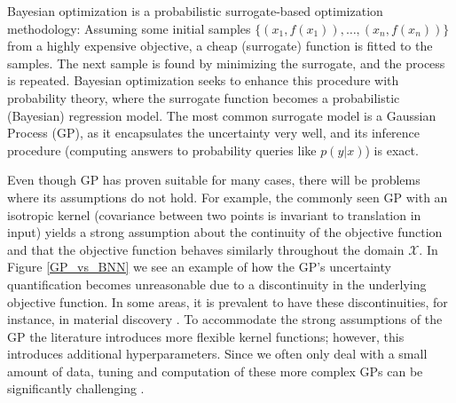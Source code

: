 Bayesian optimization is a probabilistic surrogate-based optimization methodology: Assuming some
initial samples $\{(x_1,f(x_1)), \dots, (x_n,f(x_n))\}$ from a highly expensive objective, a cheap
(surrogate) function is fitted to the samples. The next sample is found by
minimizing the surrogate, and the process is repeated. Bayesian optimization seeks to enhance this
procedure with probability theory, where the surrogate function becomes a probabilistic (Bayesian)
regression model. The most common surrogate model is a Gaussian Process (GP), as it encapsulates the
uncertainty very well, and its inference procedure (computing answers to probability queries like
$p(y|x)$) is exact. %


Even though GP has proven suitable for many cases, there will be problems where its assumptions do
not hold. For example, the commonly seen GP with an isotropic kernel (covariance between two points
is invariant to translation in input) yields a strong assumption about the continuity of the
objective function and that the objective function behaves similarly throughout the domain
$\mathcal{X}$. In Figure \ref{GP_vs_BNN} we see an example of how the GP's uncertainty
quantification becomes unreasonable due to a discontinuity in the underlying objective function. In
some areas, it is prevalent to have these discontinuities, for instance, in material discovery
\cite{Nature_BO_paper}. To accommodate the strong assumptions of the GP the literature introduces
more flexible kernel functions; however, this introduces additional hyperparameters. Since we often
only deal with a small amount of data, tuning and computation of these more complex GPs can be
significantly challenging \cite{Nature_BO_paper}.

